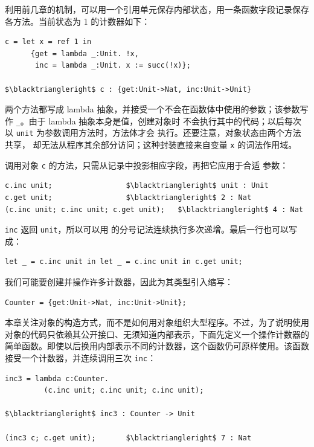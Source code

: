 利用前几章的机制，可以用一个引用单元保存内部状态，用一条函数字段记录保存
各方法。当前状态为 1 的计数器如下：

\begin{lstlisting}[mathescape=true]
c = let x = ref 1 in
      {get = lambda _:Unit. !x,
       inc = lambda _:Unit. x := succ(!x)};

$\blacktriangleright$ c : {get:Unit->Nat, inc:Unit->Unit}
\end{lstlisting}

两个方法都写成 lambda 抽象，并接受一个不会在函数体中使用的参数；该参数写作
\texttt{\_}。由于 lambda 抽象本身是值，创建对象时
不会执行其中的代码；以后每次以 \texttt{unit} 为参数调用方法时，方法体才会
执行。还要注意，对象状态由两个方法共享，
却无法从程序其余部分访问；这种封装直接来自变量 \texttt{x} 的词法作用域。

调用对象 \texttt{c} 的方法，只需从记录中投影相应字段，再把它应用于合适
参数：

\begin{lstlisting}[mathescape=true]
c.inc unit;                 $\blacktriangleright$ unit : Unit
c.get unit;                 $\blacktriangleright$ 2 : Nat
(c.inc unit; c.inc unit; c.get unit);   $\blacktriangleright$ 4 : Nat
\end{lstlisting}

\texttt{inc} 返回 \texttt{unit}，所以可以用
的分号记法连续执行多次递增。最后一行也可以写成：

\begin{lstlisting}[mathescape=true]
let _ = c.inc unit in let _ = c.inc unit in c.get unit;
\end{lstlisting}

我们可能要创建并操作许多计数器，因此为其类型引入缩写：

\begin{lstlisting}[mathescape=true]
Counter = {get:Unit->Nat, inc:Unit->Unit};
\end{lstlisting}

本章关注对象的构造方式，而不是如何用对象组织大型程序。不过，为了说明使用
对象的代码只依赖其公开接口、无须知道内部表示，下面先定义一个操作计数器的
简单函数。即使以后换用内部表示不同的计数器，这个函数仍可原样使用。该函数
接受一个计数器，并连续调用三次 \texttt{inc}：

\begin{lstlisting}[mathescape=true]
inc3 = lambda c:Counter.
         (c.inc unit; c.inc unit; c.inc unit);

$\blacktriangleright$ inc3 : Counter -> Unit

(inc3 c; c.get unit);       $\blacktriangleright$ 7 : Nat
\end{lstlisting}

